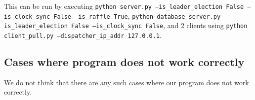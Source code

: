 \documentclass{article}
\begin{document}
This can be run by executing {\tt python server.py --is\_leader\_election False --is\_clock\_sync False --is\_raffle True},
{\tt python database\_server.py --is\_leader\_election False --is\_clock\_sync False}, and 2 clients using
{\tt python client\_pull.py --dispatcher\_ip\_addr 127.0.0.1}.

\subsection{Cases where program does not work correctly}
We do not think that there are any such cases where our program does not work
correctly.
\end{document}
